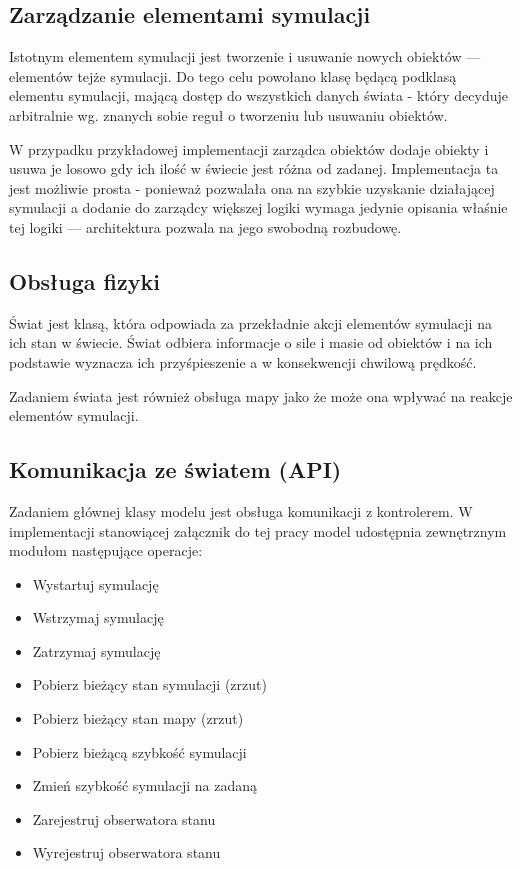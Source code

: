 {{\subsection{Zarządzanie elementami symulacji}
\par{
Istotnym elementem symulacji jest tworzenie i usuwanie nowych obiektów --- elementów tejże symulacji. Do tego celu powołano klasę będącą podklasą elementu symulacji, mającą dostęp do wszystkich danych świata - który decyduje arbitralnie  wg. znanych sobie reguł o tworzeniu lub usuwaniu obiektów.
}
\par{
W przypadku przykładowej implementacji zarządca obiektów dodaje obiekty i usuwa je losowo gdy ich ilość w świecie jest różna od zadanej. Implementacja ta jest możliwie prosta - ponieważ pozwalała ona na szybkie uzyskanie działającej symulacji a dodanie do zarządcy większej logiki wymaga jedynie opisania właśnie tej logiki --- architektura pozwala na jego swobodną rozbudowę.
}

\subsection{Obsługa fizyki}
\par{
Świat jest klasą, która odpowiada za przekładnie akcji elementów symulacji na ich stan w świecie. Świat odbiera informacje o sile i masie od obiektów i na ich podstawie wyznacza ich przyśpieszenie a w konsekwencji chwilową prędkość.
}
\par{
Zadaniem świata jest również obsługa mapy jako że może ona wpływać na reakcje elementów symulacji.
}

\subsection{Komunikacja ze światem (API)}
\par{
Zadaniem głównej klasy modelu jest obsługa komunikacji z kontrolerem. W implementacji stanowiącej załącznik do tej pracy model udostępnia zewnętrznym modułom następujące operacje:
\begin{itemize}
\item Wystartuj symulację
\item Wstrzymaj symulację
\item Zatrzymaj symulację
\item Pobierz bieżący stan symulacji (zrzut)
\item Pobierz bieżący stan mapy (zrzut)
\item Pobierz bieżącą szybkość symulacji
\item Zmień szybkość symulacji na zadaną
\item Zarejestruj obserwatora stanu
\item Wyrejestruj obserwatora stanu
\end{itemize}
}
}}
